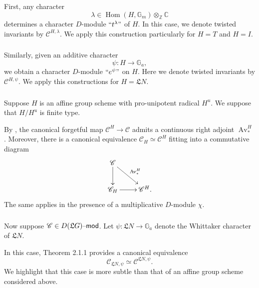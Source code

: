 \documentclass[11pt,reqno]{amsart}
\newcommand{\Hom}{\operatorname{Hom}}
\newcommand{\fL}{\mathfrak{L}}
\newcommand{\on}{\operatorname}
\theoremstyle{remark}
\numberwithin{equation}{section}
\newcommand{\cC}{\mathscr{C}}
\renewcommand{\mod}{\text{\textendash}\mathsf{mod}}
\begin{document}
\subsubsection{}

First, any character \[\lambda \in 
\Hom(H,\mathbb{G}_m) \otimes_{\mathbb{Z}} \mathbb{C}\] 
determines a character $D$-module $``t^\lambda"$ of $H$.
In this case, we denote twisted
invariants by $\cC^{H,\lambda}$.
We apply this construction particularly for $H = T$ and $H = I$.

\subsubsection{}
Similarly, given an additive character
%
\[
\psi: H \rightarrow \mathbb{G}_a,
\]
%
we obtain a character $D$-module 
$``e^\psi"$ on $H$. Here we denote twisted
invariants by $\cC^{H,\psi}$.
We apply this constructions for $H = \fL N$. 

\subsubsection{}

Suppose $H$ is an affine group scheme with 
pro-unipotent radical $H^u$. We suppose that
$H/H^u$ is finite type.

By \cite{beraldo}, the canonical 
forgetful map $\cC^H \rightarrow \cC$ admits a 
continuous right adjoint 
$\on{Av}_*^H$.
Moreover, there is a canonical
equivalence $\cC_H \simeq \cC^H$ fitting into a commutative
diagram
%
\begin{equation} \label{e:inv1}
\vcenter{\xymatrix{
\cC \ar[d] \ar[dr]^{\on{Av}^H_*} & \\
\cC_{H} \ar[r] & \cC^{H}.
}}
\end{equation}
%
\noindent The same applies in the presence of a multiplicative
$D$-module $\chi$.

\subsubsection{}

Now suppose $\cC \in D(\fL G)\mod$. 
Let $\psi:\fL N \to \mathbb{G}_a$ denote the Whittaker character of 
$\fL N$. 

In this case, \cite{whit} Theorem 2.1.1 provides
a canonical equivalence
%
\begin{equation}\label{e:inv2} 
\cC_{\fL N, \psi} \simeq \cC^{\fL N, \psi}.
\end{equation}
%
\noindent We highlight that this case is more subtle than
that of an affine group scheme considered above. 
\end{document}
